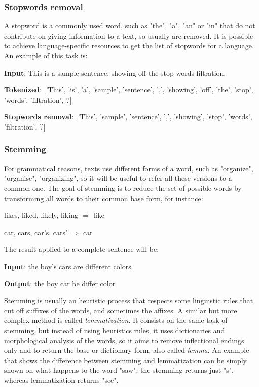 \subsubsection{Stopwords removal}
A stopword is a commonly used word, such as "the", "a", "an" or "in" that do not contribute on giving information to a text, so usually are removed. It is possible to achieve language-specific resources to get the list of stopwords for a language. An example of this task is:
\begin{description}
	\item \textbf{Input}: This is a sample sentence, showing off the stop words filtration.
	\item \textbf{Tokenized}: ['This', 'is', 'a', 'sample', 'sentence', ',', 'showing', 'off', 'the', 'stop', 'words', 'filtration', '.']
	\item \textbf{Stopwords removal}: ['This', 'sample', 'sentence', ',', 'showing', 'stop', 'words', 'filtration', '.']
\end{description}


\subsubsection{Stemming}
For grammatical reasons, texts use different forms of a word, such as "organize", "organise", "organizing", so it will be useful to refer all these versions to a common one. The goal of stemming is to reduce the set of possible words by transforming all words to their common base form, for instance:
\begin{description}
	\item likes, liked, likely, liking $\Rightarrow$ like
	\item car, cars, car's, cars' $\Rightarrow$ car
\end{description}
The result applied to a complete sentence will be:
\begin{description}
	\item \textbf{Input}: the boy's cars are different colors
	\item \textbf{Output}: the boy car be differ color
\end{description}
Stemming is usually an heuristic process that respects some linguistic rules that cut off suffixes of the words, and sometimes the affixes. A similar but more complex method is called \textit{lemmatization}. It consists on the same task of stemming, but instead of using heuristics rules, it uses dictionaries and morphological analysis of the words, so it aims to remove inflectional endings only and to return the base or dictionary form, also called \textit{lemma}. An example that shows the difference between stemming and lemmatization can be simply shown on what happens to the word "saw": the stemming returns just "s", whereas lemmatization returns "see".


